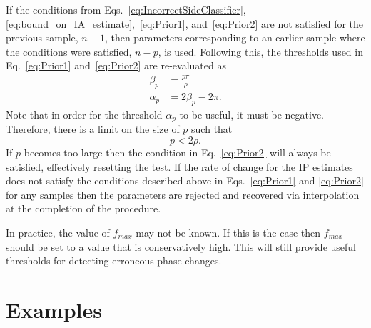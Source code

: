 \documentclass[11pt,draftcls,onecolumn]{IEEEtran}
\begin{document}
If the conditions from Eqs.~\ref{eq:IncorrectSideClassifier}, \ref{eq:bound_on_IA_estimate},~\ref{eq:Prior1}, and~\ref{eq:Prior2} are not satisfied for the previous sample, $n-1$, then parameters corresponding to an earlier sample where the conditions were satisfied, $n-p$, is used. Following this, the thresholds used in Eq.~\ref{eq:Prior1} and~\ref{eq:Prior2} are re-evaluated as
\begin{align}
	\beta_p &= \frac{p\pi}{\rho} \\
	\alpha_p &=2\beta_p-2\pi.
\end{align}
Note that in order for the threshold $\alpha_p$ to be useful, it must be negative. Therefore, there is a limit on the size of $p$ such that
\begin{equation}
	p < 2\rho.
\end{equation}
If $p$ becomes too large then the condition in Eq.~\ref{eq:Prior2} will always be satisfied, effectively resetting the test. If the rate of change for the IP estimates does not satisfy the conditions described above in Eqs.~\ref{eq:Prior1} and \ref{eq:Prior2} for any samples then the parameters are rejected and recovered via interpolation at the completion of the procedure.

In practice, the value of $f_{max}$ may not be known. If this is the case then $f_{max}$ should be set to a value that is conservatively high. This will still provide useful thresholds for detecting erroneous phase changes.

\section{Examples}\label{sect:Examples}
\end{document}
